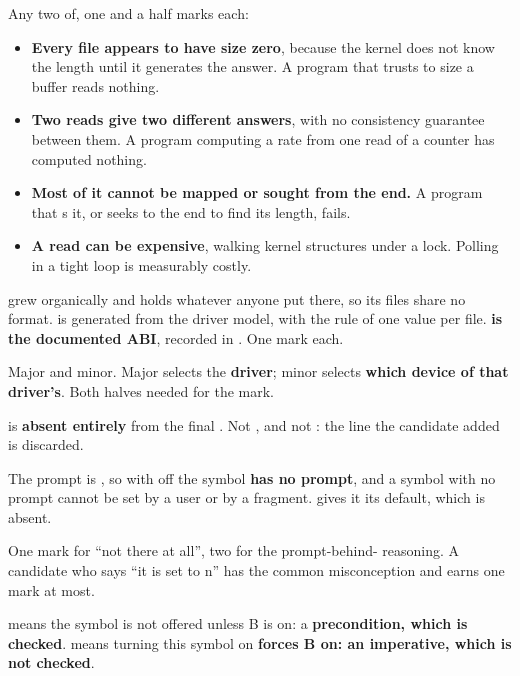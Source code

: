 Any two of, one and a half marks each:
\begin{itemize}
  \item \textbf{Every file appears to have size zero}, because the kernel does not know the length
    until it generates the answer. A program that trusts  to size a buffer reads nothing.
  \item \textbf{Two reads give two different answers}, with no consistency guarantee between them. A
    program computing a rate from one read of a counter has computed nothing.
  \item \textbf{Most of it cannot be mapped or sought from the end.} A program that s
    it, or seeks to the end to find its length, fails.
  \item \textbf{A read can be expensive}, walking kernel structures under a lock. Polling in a tight
    loop is measurably costly.
\end{itemize}

 grew organically and holds whatever anyone put there, so its files share no format.
 is generated from the driver model, with the rule of one value per file.
\textbf{ is the documented ABI}, recorded in . One mark each.

Major and minor. Major selects the \textbf{driver}; minor selects \textbf{which device of that
driver's}. Both halves needed for the mark.


 is \textbf{absent entirely} from the final . Not ,
and not : the line the candidate added is discarded.

The prompt is , so with  off the symbol \textbf{has no
prompt}, and a symbol with no prompt cannot be set by a user or by a fragment. 
gives it its default, which is absent.

One mark for ``not there at all'', two for the prompt-behind- reasoning. A candidate
who says ``it is set to n'' has the common misconception and earns one mark at most.

 means the symbol is not offered unless B is on: a \textbf{precondition, which is
checked}.  means turning this symbol on \textbf{forces B on: an imperative, which is
not checked}.

